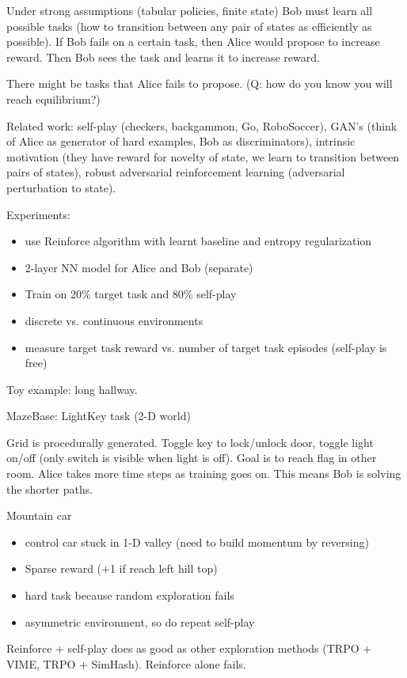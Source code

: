 Under strong assumptions (tabular policies, finite state) Bob must learn all possible tasks (how to transition between any pair of states as efficiently as possible). If Bob fails on a certain task, then Alice would propose to increase reward. Then Bob sees the task and learns it to increase reward.

There might be tasks that Alice fails to propose. 
(Q: how do you know you will reach equilibrium?)

Related work: self-play (checkers, backgammon, Go, RoboSoccer), GAN's (think of Alice as generator of hard examples, Bob as discriminators), intrinsic motivation (they have reward for novelty of state, we learn to transition between pairs of states), robust adversarial reinforcement learning (adversarial perturbation to state).

Experiments:
\begin{itemize}
\item
use Reinforce algorithm with learnt baseline and entropy regularization
\item
2-layer NN model for Alice and Bob (separate)
\item
Train on 20\% target task and 80\% self-play
\item
discrete vs. continuous environments
\item
measure target task reward vs. number of target task episodes (self-play is free)
\end{itemize}
Toy example: long hallway.

MazeBase: LightKey task (2-D world)

Grid is procedurally generated. Toggle key to lock/unlock door, toggle light on/off (only switch is visible when light is off). Goal is to reach flag in other room.
Alice takes more time steps as training goes on. This means Bob is solving the shorter paths.

Mountain car
\begin{itemize}
\item
control car stuck in 1-D valley (need to build momentum by reversing)
\item
Sparse reward (+1 if reach left hill top)
\item
hard task because random exploration fails
\item
asymmetric environment, so do repeat self-play
\end{itemize}
Reinforce + self-play does as good as other exploration methods (TRPO + VIME, TRPO + SimHash). Reinforce alone fails.

